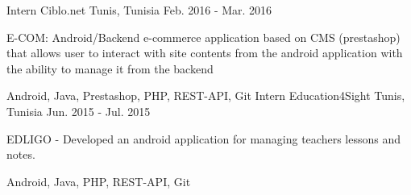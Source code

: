 \begin{cventries}
  \cventrydetailed
    {Intern} %
    {Ciblo.net} %
    {Tunis, Tunisia} %
    {Feb. 2016 - Mar. 2016} %
    {
      \begin{cvitems} %
        \item {E-COM: Android/Backend e-commerce application based on CMS
        	(prestashop) that allows user to interact with site contents from the
        	android application with the ability to manage it from the backend}
      \end{cvitems}
    }
    {Android, Java, Prestashop, PHP, REST-API, Git} %
  \cventrydetailed
    {Intern} %
    {Education4Sight} %
    {Tunis, Tunisia} %
    {Jun. 2015 - Jul. 2015} %
    {
    	\begin{cvitems} %
    		\item {EDLIGO - Developed an android application for managing teachers lessons and notes.}
    	\end{cvitems}
    }
    {Android, Java, PHP, REST-API, Git} %

\end{cventries}
